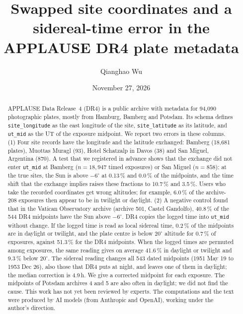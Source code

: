 \documentclass[11pt]{article}
\title{Swapped site coordinates and a sidereal-time error in the APPLAUSE DR4 plate metadata}
\author{Qianghao Wu}
\date{November 27, 2026}
\begin{document}
\sloppy
\maketitle

\begin{abstract}
APPLAUSE Data Release~4 (DR4) is a public archive with metadata for 94{,}090 photographic plates, mostly from Hamburg, Bamberg and Potsdam. Its schema defines \texttt{site\_longitude} as the east longitude of the site, \texttt{site\_latitude} as its latitude, and \texttt{ut\_mid} as the UT of the exposure midpoint. We report two errors in these columns. (1) Four site records have the longitude and the latitude exchanged: Bamberg (18{,}681 plates), Muottas Muragl (93), Hotel Schatzalp in Davos (38) and San Miguel, Argentina (870). A test that we registered in advance shows that the exchange did not enter \texttt{ut\_mid} at Bamberg ($n=18{,}947$ timed exposures) or San Miguel ($n=858$): at the true sites, the Sun is above $-6^\circ$ at 0.13\,\% and 0.0\,\% of the midpoints, and the time shift that the exchange implies raises these fractions to 10.7\,\% and 3.5\,\%. Users who take the recorded coordinates get wrong altitudes; for example, 6.0\,\% of the archive-208 exposures then appear to be in twilight or daylight. (2) A negative control found that in the Vatican Observatory archive (archive 501, Castel Gandolfo), 40.8\,\% of the 544 DR4 midpoints have the Sun above $-6^\circ$. DR4 copies the logged time into \texttt{ut\_mid} without change. If the logged time is read as local sidereal time, 0.2\,\% of the midpoints are in daylight or twilight, and the plate centre is below $20^\circ$ altitude for 0.7\,\% of exposures, against 51.3\,\% for the DR4 midpoints. When the logged times are permuted among exposures, the same reading gives on average 41.6\,\% in daylight or twilight and 9.3\,\% below $20^\circ$. The sidereal reading changes all 543 dated midpoints (1951 May 19 to 1953 Dec 26), also those that DR4 puts at night, and leaves one of them in daylight; the median correction is 4.9\,h. We give a corrected midpoint for each exposure. The midpoints of Potsdam archives 4 and 5 are also often in daylight; we did not find the cause.
This work has not yet been reviewed by experts. The computations and the text were produced by AI models (from Anthropic and OpenAI), working under the author's direction.
\end{abstract}
\end{document}
